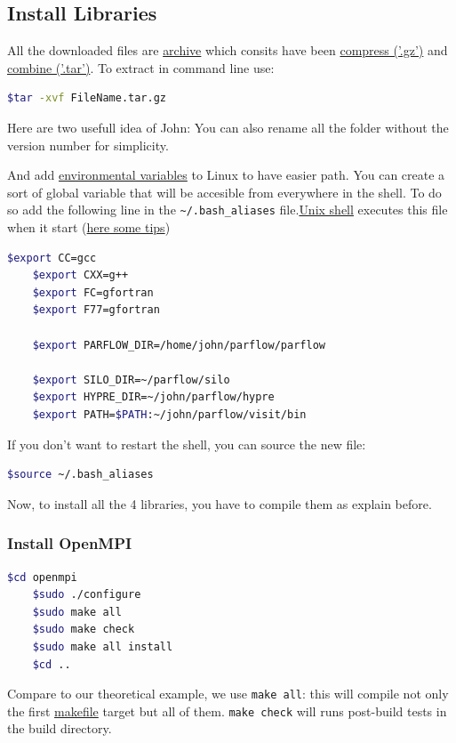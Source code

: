 \documentclass[11pt,a4paper]{report}
\begin{document}
\subsection{Install Libraries}
All the downloaded files are \href{http://en.wikipedia.org/wiki/File_archiver}{archive} which consits have been \href{http://en.wikipedia.org/wiki/Gzip}{compress ('.gz')} and  \href{(http://en.wikipedia.org/wiki/Tar_(file_format)}{combine ('.tar')}. To extract in command line use:
\begin{lstlisting}[language=bash]
    $tar -xvf FileName.tar.gz 
\end{lstlisting}

Here are two usefull idea of John:
You can also rename all the folder without the version number for simplicity.

And add \href{https://en.wikipedia.org/wiki/Environment_variable}{environmental variables} to Linux to have easier path. You can create a sort of global variable that will be accesible from everywhere in the shell. To do so add the following line in the \verb$~/.bash_aliases$ file.\href{https://en.wikipedia.org/wiki/Bash_(Unix_shell)}{Unix shell} executes this file when it start (\href{http://www.cyberciti.biz/tips/howto-linux-unix-bash-shell-setup-prompt.html}{here some tips})

\begin{lstlisting}[language=bash]
	$export CC=gcc
	$export CXX=g++
	$export FC=gfortran
	$export F77=gfortran

	$export PARFLOW_DIR=/home/john/parflow/parflow

	$export SILO_DIR=~/parflow/silo
	$export HYPRE_DIR=~/john/parflow/hypre
	$export PATH=$PATH:~/john/parflow/visit/bin
\end{lstlisting}

If you don't want to restart the shell, you can source the new file:
\begin{lstlisting}[language=bash]
    $source ~/.bash_aliases
\end{lstlisting}

Now, to install all the 4 libraries, you have to compile them as explain before. 
\subsubsection{Install OpenMPI}
\begin{lstlisting}[language=bash]
    $cd openmpi
    $sudo ./configure
    $sudo make all
    $sudo make check
    $sudo make all install
    $cd ..
 \end{lstlisting}
Compare to our theoretical example, we use \verb$make all$: this will compile not only the first \href{https://en.wikipedia.org/wiki/Make_(software)}{makefile} target but all of them. \verb$make check$ will runs post-build tests in the build directory.
 
\end{document}
